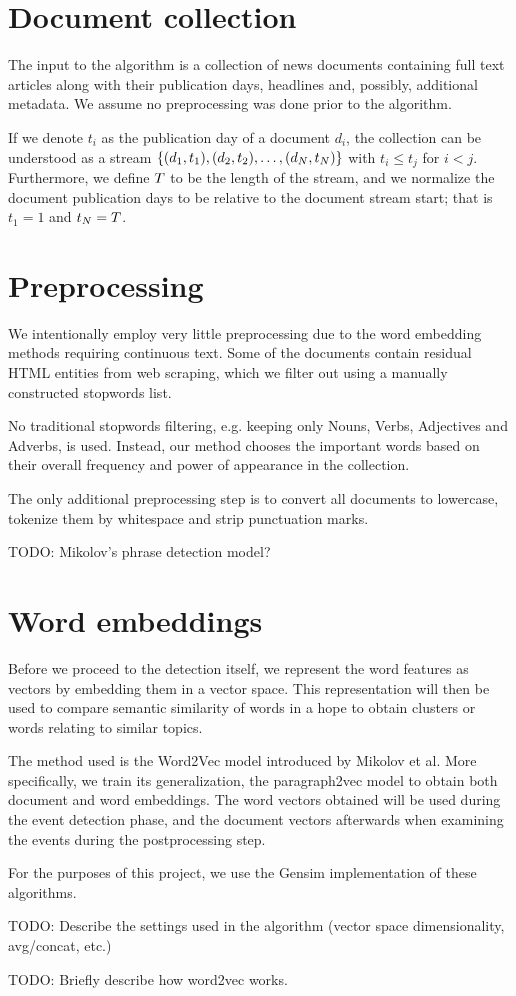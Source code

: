 \section{Document collection}
The input to the algorithm is a collection of news documents containing full text articles along with their publication days, headlines and, possibly, additional metadata. We assume no preprocessing was done prior to the algorithm.

If we denote $t_{i}$ as the publication day of a document $d_{i}$, the collection can be understood as a stream $\left\{ (d_{1}, t_{1}), (d_{2}, t_{2}), \dots, (d_{N}, t_{N}) \right\}$ with $t_{i} \leq t_{j}$ for $i < j$. Furthermore, we define $T$ to be the length of the stream, and we normalize the document publication days to be relative to the document stream start; that is $t_{1} = 1$ and $t_{N} = T$.


\section{Preprocessing}
We intentionally employ very little preprocessing due to the word embedding methods requiring continuous text. Some of the documents contain residual HTML entities from web scraping, which we filter out using a manually constructed stopwords list.

No traditional stopwords filtering, e.g. keeping only Nouns, Verbs, Adjectives and Adverbs, is used. Instead, our method chooses the important words based on their overall frequency and power of appearance in the collection.

The only additional preprocessing step is to convert all documents to lowercase, tokenize them by whitespace and strip punctuation marks.

{\color{red} TODO: Mikolov's phrase detection model?}


\section{Word embeddings} \label{word-embeddings}
Before we proceed to the detection itself, we represent the word features as vectors by embedding them in a vector space. This representation will then be used to compare semantic similarity of words in a hope to obtain clusters or words relating to similar topics.

The method used is the Word2Vec model \cite{word2vec} introduced by Mikolov et al. More specifically, we train its generalization, the paragraph2vec model \cite{doc2vec} to obtain both document and word embeddings. The word vectors obtained will be used during the event detection phase, and the document vectors afterwards when examining the events during the postprocessing step.

For the purposes of this project, we use the Gensim \cite{gensim} implementation of these algorithms.

{\color{red} TODO: Describe the settings used in the algorithm (vector space dimensionality, avg/concat, etc.)}

{\color{red} TODO: Briefly describe how word2vec works.}